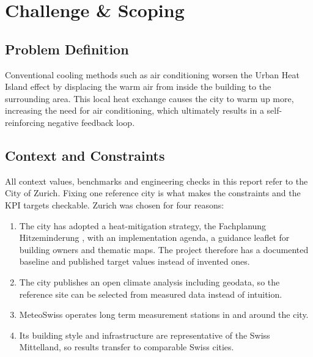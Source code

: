 \section{Challenge \& Scoping}
\label{sec:scoping}

\subsection{Problem Definition}
\label{sec:problem}

Conventional cooling methods such as air conditioning worsen the Urban Heat Island effect
by displacing the warm air from inside the building to the surrounding area. This local
heat exchange causes the city to warm up more, increasing the need for air conditioning,
which ultimately results in a self-reinforcing negative feedback loop.

\subsection{Context and Constraints}
\label{sec:context}

All context values, benchmarks and engineering checks in this report refer to the City
of Zurich. Fixing one reference city is what makes the constraints and the KPI targets
checkable. Zurich was chosen for four reasons:

\begin{enumerate}
  \item The city has adopted a heat-mitigation strategy, the Fachplanung Hitzeminderung
    \cite{stadtzuerich_web}, with an implementation agenda, a guidance leaflet for
    building owners and thematic maps. The project therefore has a documented baseline
    and published target values instead of invented ones.
  \item The city publishes an open climate analysis including geodata, so the reference
    site can be selected from measured data instead of intuition.
  \item MeteoSwiss operates long term measurement stations in and around the city.
  \item Its building style and infrastructure are representative of the Swiss
    Mittelland, so results transfer to comparable Swiss cities.
\end{enumerate}

\clearpage

